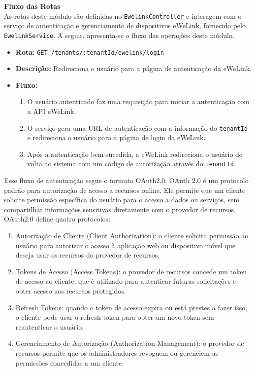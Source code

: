 \noindent\textbf{Fluxo das Rotas} \\
As rotas deste módulo são definidas no \texttt{EwelinkController} e interagem com o serviço de autenticação e gerenciamento de dispositivos eWeLink, fornecido pelo \texttt{EwelinkService}. A seguir, apresenta-se o fluxo das operações deste módulo.

\begin{itemize}
    \item \textbf{Rota:} \texttt{GET /tenants/:tenantId/ewelink/login}
    \item \textbf{Descrição:} Redireciona o usuário para a página de autenticação da eWeLink.
    \item \textbf{Fluxo:}
    \begin{enumerate}
        \item O usuário autenticado faz uma requisição para iniciar a autenticação com a API eWeLink.
        \item O serviço gera uma URL de autenticação com a informação do \texttt{tenantId} e redireciona o usuário para a página de login da eWeLink.
        \item Após a autenticação bem-sucedida, a eWeLink redireciona o usuário de volta ao sistema com um código de autorização através do \texttt{tenantId}.
    \end{enumerate}
\end{itemize}

Esse fluxo de autenticação segue o formato OAuth2.0. \acrfull{OAuth} 2.0 é um protocolo padrão para autorização de acesso a recursos online. Ele permite que um cliente solicite permissão específica do usuário para o acesso a dados ou serviços, sem compartilhar informações sensitivas diretamente com o provedor de recursos. OAuth2.0 define quatro protocolos:

\begin{enumerate}
  \item Autorização de Cliente (Client Authorization): o cliente solicita permissão ao usuário para autorizar o acesso à aplicação web ou dispositivo móvel que deseja usar os recursos do provedor de recursos.
  \item Tokens de Acesso (Access Tokens): o provedor de recursos concede um token de acesso ao cliente, que é utilizado para autenticar futuras solicitações e obter acesso aos recursos protegidos.
  \item Refresh Tokens: quando o token de acesso expira ou está prestes a fazer isso, o cliente pode usar o refresh token para obter um novo token sem reautenticar o usuário.
  \item Gerenciamento de Autorização (Authorization Management): o provedor de recursos permite que os administradores revoguem ou gerenciem as permissões concedidas a um cliente.
\end{enumerate}

